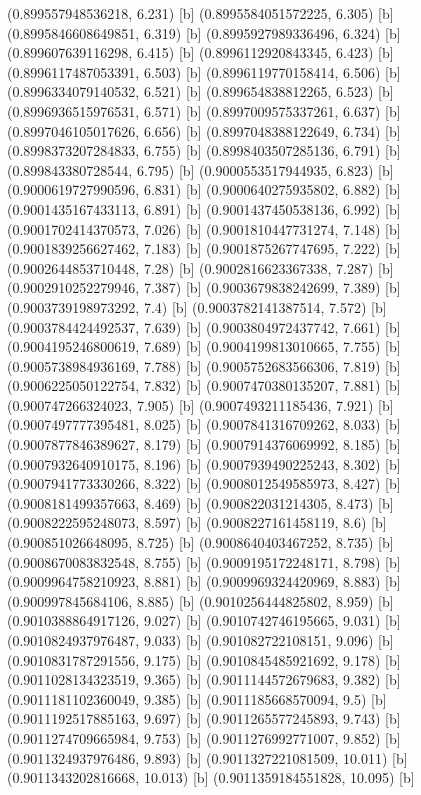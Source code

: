 {{{(0.899557948536218, 6.231) [b] 
(0.8995584051572225, 6.305) [b] 
(0.8995846608649851, 6.319) [b] 
(0.8995927989336496, 6.324) [b] 
(0.899607639116298, 6.415) [b] 
(0.8996112920843345, 6.423) [b] 
(0.8996117487053391, 6.503) [b] 
(0.8996119770158414, 6.506) [b] 
(0.8996334079140532, 6.521) [b] 
(0.899654838812265, 6.523) [b] 
(0.8996936515976531, 6.571) [b] 
(0.8997009575337261, 6.637) [b] 
(0.8997046105017626, 6.656) [b] 
(0.8997048388122649, 6.734) [b] 
(0.8998373207284833, 6.755) [b] 
(0.8998403507285136, 6.791) [b] 
(0.899843380728544, 6.795) [b] 
(0.9000553517944935, 6.823) [b] 
(0.9000619727990596, 6.831) [b] 
(0.9000640275935802, 6.882) [b] 
(0.9001435167433113, 6.891) [b] 
(0.9001437450538136, 6.992) [b] 
(0.9001702414370573, 7.026) [b] 
(0.9001810447731274, 7.148) [b] 
(0.9001839256627462, 7.183) [b] 
(0.9001875267747695, 7.222) [b] 
(0.9002644853710448, 7.28) [b] 
(0.9002816623367338, 7.287) [b] 
(0.9002910252279946, 7.387) [b] 
(0.9003679838242699, 7.389) [b] 
(0.9003739198973292, 7.4) [b] 
(0.9003782141387514, 7.572) [b] 
(0.9003784424492537, 7.639) [b] 
(0.9003804972437742, 7.661) [b] 
(0.9004195246800619, 7.689) [b] 
(0.9004199813010665, 7.755) [b] 
(0.9005738984936169, 7.788) [b] 
(0.9005752683566306, 7.819) [b] 
(0.9006225050122754, 7.832) [b] 
(0.9007470380135207, 7.881) [b] 
(0.900747266324023, 7.905) [b] 
(0.9007493211185436, 7.921) [b] 
(0.9007497777395481, 8.025) [b] 
(0.9007841316709262, 8.033) [b] 
(0.9007877846389627, 8.179) [b] 
(0.9007914376069992, 8.185) [b] 
(0.9007932640910175, 8.196) [b] 
(0.9007939490225243, 8.302) [b] 
(0.9007941773330266, 8.322) [b] 
(0.9008012549585973, 8.427) [b] 
(0.9008181499357663, 8.469) [b] 
(0.900822031214305, 8.473) [b] 
(0.9008222595248073, 8.597) [b] 
(0.9008227161458119, 8.6) [b] 
(0.900851026648095, 8.725) [b] 
(0.9008640403467252, 8.735) [b] 
(0.9008670083832548, 8.755) [b] 
(0.9009195172248171, 8.798) [b] 
(0.9009964758210923, 8.881) [b] 
(0.9009969324420969, 8.883) [b] 
(0.900997845684106, 8.885) [b] 
(0.9010256444825802, 8.959) [b] 
(0.9010388864917126, 9.027) [b] 
(0.9010742746195665, 9.031) [b] 
(0.9010824937976487, 9.033) [b] 
(0.901082722108151, 9.096) [b] 
(0.9010831787291556, 9.175) [b] 
(0.9010845485921692, 9.178) [b] 
(0.9011028134323519, 9.365) [b] 
(0.9011144572679683, 9.382) [b] 
(0.9011181102360049, 9.385) [b] 
(0.9011185668570094, 9.5) [b] 
(0.9011192517885163, 9.697) [b] 
(0.9011265577245893, 9.743) [b] 
(0.9011274709665984, 9.753) [b] 
(0.9011276992771007, 9.852) [b] 
(0.9011324937976486, 9.893) [b] 
(0.9011327221081509, 10.011) [b] 
(0.9011343202816668, 10.013) [b] 
(0.9011359184551828, 10.095) [b] 
}}}
